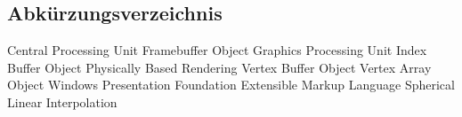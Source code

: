 \begin{acronym}
	\chapter*{Abkürzungsverzeichnis}
	 {Central Processing Unit}
	 {Framebuffer Object}
	 {Graphics Processing Unit}
	 {Index Buffer Object}
	 {Physically Based Rendering}
	 {Vertex Buffer Object}
	 {Vertex Array Object}
		{Windows Presentation Foundation}
	 {Extensible Markup Language}
	 {Spherical Linear Interpolation}
\end{acronym}